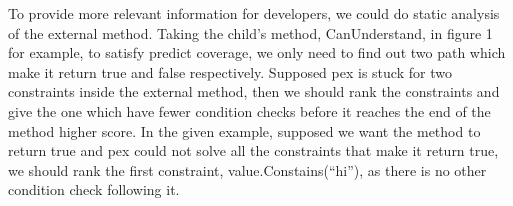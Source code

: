 To provide more relevant information for developers, we could do static analysis of the external method. Taking the child's method, CanUnderstand, in figure 1 for example, to satisfy predict coverage, we only need to find out two path which make it return true and false respectively. Supposed pex is stuck for two constraints inside the external method, then we should rank the constraints and give the one which have fewer condition checks before it reaches the end of the method higher score. In the given example, supposed we want the method to return true and pex could not solve all the constraints that make it return true, we should rank the first constraint, value.Constains(``hi''), as there is no other condition check following it. 
